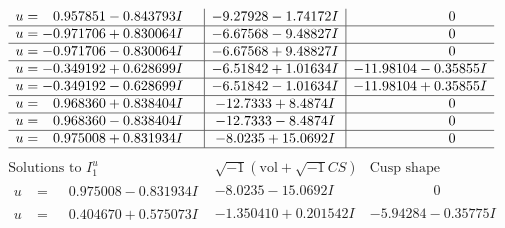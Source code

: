 \documentclass[1p]{elsarticle_modified}
\theoremstyle{definition}
\newcommand{\I}{\sqrt{-1}}
\begin{document}
$$\begin{array}{c|c|c}
\begin{aligned}
u &= \phantom{-}0.957851 - 0.843793 I\end{aligned}
 & -9.27928 - 1.74172 I & \phantom{-0.000000 } 0 \\ \hline\begin{aligned}
u &= -0.971706 + 0.830064 I\end{aligned}
 & -6.67568 - 9.48827 I & \phantom{-0.000000 } 0 \\ \hline\begin{aligned}
u &= -0.971706 - 0.830064 I\end{aligned}
 & -6.67568 + 9.48827 I & \phantom{-0.000000 } 0 \\ \hline\begin{aligned}
u &= -0.349192 + 0.628699 I\end{aligned}
 & -6.51842 + 1.01634 I & -11.98104 - 0.35855 I \\ \hline\begin{aligned}
u &= -0.349192 - 0.628699 I\end{aligned}
 & -6.51842 - 1.01634 I & -11.98104 + 0.35855 I \\ \hline\begin{aligned}
u &= \phantom{-}0.968360 + 0.838404 I\end{aligned}
 & -12.7333 + 8.4874 I & \phantom{-0.000000 } 0 \\ \hline\begin{aligned}
u &= \phantom{-}0.968360 - 0.838404 I\end{aligned}
 & -12.7333 - 8.4874 I & \phantom{-0.000000 } 0 \\ \hline\begin{aligned}
u &= \phantom{-}0.975008 + 0.831934 I\end{aligned}
 & -8.0235 + 15.0692 I & \phantom{-0.000000 } 0\\
 \hline 
 \end{array}$$\newpage$$\begin{array}{c|c|c}  
\text{Solutions to }I^u_{1}& \I (\text{vol} + \sqrt{-1}CS) & \text{Cusp shape}\\
 \hline 
\begin{aligned}
u &= \phantom{-}0.975008 - 0.831934 I\end{aligned}
 & -8.0235 - 15.0692 I & \phantom{-0.000000 } 0 \\ \hline\begin{aligned}
u &= \phantom{-}0.404670 + 0.575073 I\end{aligned}
 & -1.350410 + 0.201542 I & -5.94284 - 0.35775 I \\ \hline\begin{aligned}

\end{aligned}
\end{array}$$
\end{document}
